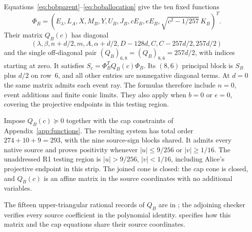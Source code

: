 Equations~\eqref{eq:bobparent}--\eqref{eq:boballocation} give the ten
fixed functions
\[
 \Phi_B=(E_\lambda,L_A,X,M_B,Y,U_B,J_B,cE_B,eE_B,
                          \sqrt{c^2-1/257}\,K_B)^T.
\]
Their matrix $Q_B(c)$ has diagonal
\[
 (\lambda,\beta,n+d/2,m,A,\alpha+d/2,
                   D-128d,C,C-257d/2,257d/2)
\]
and the single off-diagonal pair $(Q_B)_{6,8}=(Q_B)_{8,6}=257d/2$,
with indices starting at zero. It satisfies $S_c=\Phi_B^TQ_B(c)\Phi_B$.
Its $(8,6)$ principal block is $S_B$ plus $d/2$ on row~6, and all
other entries are nonnegative diagonal terms. At $d=0$ the same
matrix admits each event ray. The formulas therefore include $n=0$,
event additions and finite conic limits. They also apply when $b=0$
or $e=0$, covering the projective endpoints in this testing region.

Impose $Q_B(c)\succeq0$ together with the cap constraints of
Appendix~\ref{app:functions}. The resulting system has total order
$274+10+9=293$, with the nine source-sign blocks shared.
It admits every native source and proves positivity whenever
$|u|\leq9/256$ or $|v|\geq1/16$.
The unaddressed R1 testing region is $|u|>9/256$, $|v|<1/16$,
including Alice's projective endpoint in this strip.
The joined cone is closed: the cap cone is closed, and $Q_B(c)$ is
an affine matrix in the source coordinates with no additional variables.

The fifteen upper-triangular rational records of $Q_B$ are in
; the adjoining
checker verifies every source coefficient in the polynomial identity.
 specifies how this matrix and the cap
equations share their source coordinates.
